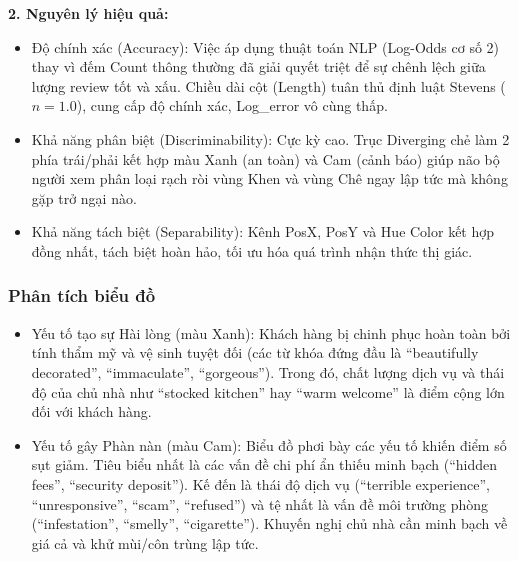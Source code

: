 \textbf{2. Nguyên lý hiệu quả:}

\begin{itemize}
    \item Độ chính xác (Accuracy): Việc áp dụng thuật toán NLP (Log-Odds cơ số 2) thay vì đếm Count thông thường đã giải quyết triệt để sự chênh lệch giữa lượng review tốt và xấu. Chiều dài cột (Length) tuân thủ định luật Stevens ($n = 1.0$), cung cấp độ chính xác, Log\_error vô cùng thấp.
    \item Khả năng phân biệt (Discriminability): Cực kỳ cao. Trục Diverging chẻ làm 2 phía trái/phải kết hợp màu Xanh (an toàn) và Cam (cảnh báo) giúp não bộ người xem phân loại rạch ròi vùng Khen và vùng Chê ngay lập tức mà không gặp trở ngại nào.
    \item Khả năng tách biệt (Separability): Kênh PosX, PosY và Hue Color kết hợp đồng nhất, tách biệt hoàn hảo, tối ưu hóa quá trình nhận thức thị giác.
\end{itemize}

\subsubsection{Phân tích biểu đồ}

\begin{itemize}
    \item Yếu tố tạo sự Hài lòng (màu Xanh): Khách hàng bị chinh phục hoàn toàn bởi tính thẩm mỹ và vệ sinh tuyệt đối (các từ khóa đứng đầu là ``beautifully decorated'', ``immaculate'', ``gorgeous''). Trong đó, chất lượng dịch vụ và thái độ của chủ nhà như ``stocked kitchen'' hay ``warm welcome'' là điểm cộng lớn đối với khách hàng.
    \item Yếu tố gây Phàn nàn (màu Cam): Biểu đồ phơi bày các yếu tố khiến điểm số sụt giảm. Tiêu biểu nhất là các vấn đề chi phí ẩn thiếu minh bạch (``hidden fees'', ``security deposit''). Kế đến là thái độ dịch vụ (``terrible experience'', ``unresponsive'', ``scam'', ``refused'') và tệ nhất là vấn đề môi trường phòng (``infestation'', ``smelly'', ``cigarette''). Khuyến nghị chủ nhà cần minh bạch về giá cả và khử mùi/côn trùng lập tức.
\end{itemize}
